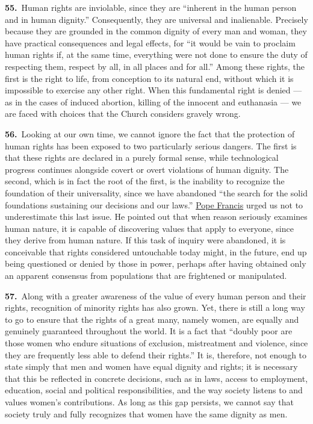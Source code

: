 \documentclass{article}
\begin{document}
\textbf{55.}\ Human rights are inviolable, since they are ``inherent in the human person and in human dignity.''\cite{n67} Consequently, they are universal and inalienable.\cite{n68} Precisely because they are grounded in the common dignity of every man and woman, they have practical consequences and legal effects, for ``it would be vain to proclaim human rights if, at the same time, everything were not done to ensure the duty of respecting them, respect by all, in all places and for all.''\cite{n69} Among these rights, the first is the right to life, from conception to its natural end,\cite{n70} without which it is impossible to exercise any other right. When this fundamental right is denied --- as in the cases of induced abortion, killing of the innocent and euthanasia --- we are faced with choices that the Church considers gravely wrong.\cite{n71}

\textbf{56.}\ Looking at our own time, we cannot ignore the fact that the protection of human rights has been exposed to two particularly serious dangers. The first is that these rights are declared in a purely formal sense, while technological progress continues alongside covert or overt violations of human dignity. The second, which is in fact the root of the first, is the inability to recognize the foundation of their universality, since we have abandoned ``the search for the solid foundations sustaining our decisions and our laws.''\cite{n72} \href{https://www.vatican.va/content/francesco/en.html}{Pope Francis} urged us not to underestimate this last issue. He pointed out that when reason seriously examines human nature, it is capable of discovering values that apply to everyone, since they derive from human nature. If this task of inquiry were abandoned, it is conceivable that rights considered untouchable today might, in the future, end up being questioned or denied by those in power, perhaps after having obtained only an apparent consensus from populations that are frightened or manipulated.\cite{n73}

\textbf{57.}\ Along with a greater awareness of the value of every human person and their rights, recognition of minority rights has also grown. Yet, there is still a long way to go to ensure that the rights of a great many, namely women, are equally and genuinely guaranteed throughout the world. It is a fact that ``doubly poor are those women who endure situations of exclusion, mistreatment and violence, since they are frequently less able to defend their rights.''\cite{n74} It is, therefore, not enough to state simply that men and women have equal dignity and rights; it is necessary that this be reflected in concrete decisions, such as in laws, access to employment, education, social and political responsibilities, and the way society listens to and values women's contributions. As long as this gap persists, we cannot say that society truly and fully recognizes that women have the same dignity as men.
\end{document}
